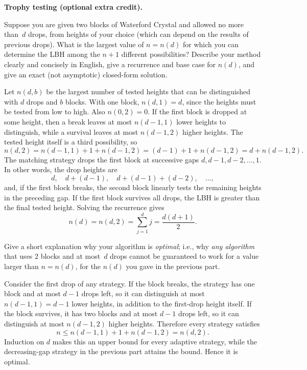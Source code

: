 \documentclass[11pt,addpoints,answers]{exam}
\begin{document}
\begin{questions}
  \bonusquestion \textbf{Trophy testing (optional extra credit).}

  \begin{parts}
    \bonuspart[2] Suppose you are given two blocks of Waterford Crystal and allowed no more than~$d$ drops, from heights of your choice (which can depend on the results of previous drops). What is the largest value of $n=n(d)$ for which you can determine the LBH among the $n+1$ different possibilities? Describe your method clearly and concisely in English, give a recurrence and base case for $n(d)$, and give an exact (not asymptotic) closed-form solution.

    \begin{solution}
      Let $n(d,b)$ be the largest number of tested heights that can be
      distinguished with $d$ drops and $b$ blocks.  With one block,
      $n(d,1)=d$, since the heights must be tested from low to high.  Also
      $n(0,2)=0$.  If the first block is dropped at some height, then a break
      leaves at most $n(d-1,1)$ lower heights to distinguish, while a survival
      leaves at most $n(d-1,2)$ higher heights.  The tested height itself is a
      third possibility, so
      \[
        n(d,2)=n(d-1,1)+1+n(d-1,2)
        =(d-1)+1+n(d-1,2)=d+n(d-1,2).
      \]
      The matching strategy drops the first block at successive gaps
      $d,d-1,d-2,\ldots,1$.  In other words, the drop heights are
      \[
        d,\quad d+(d-1),\quad d+(d-1)+(d-2),\quad\ldots,
      \]
      and, if the first block breaks, the second block linearly tests the
      remaining heights in the preceding gap.  If the first block survives all
      drops, the LBH is greater than the final tested height.  Solving the
      recurrence gives
      \[
        \boxed{n(d)=n(d,2)=\sum_{j=1}^{d}j=\frac{d(d+1)}2.}
      \]
    \end{solution}

    \bonuspart[1] Give a short explanation why your algorithm is \emph{optimal}; i.e., why \emph{any algorithm} that uses 2 blocks and at most~$d$ drops cannot be guaranteed to work for a value larger than $n=n(d)$, for the $n(d)$ you gave in the previous part.

    \begin{solution}
      Consider the first drop of any strategy.  If the block breaks, the
      strategy has one block and at most $d-1$ drops left, so it can distinguish
      at most $n(d-1,1)=d-1$ lower heights, in addition to the first-drop
      height itself.  If the block survives, it has two blocks and at most
      $d-1$ drops left, so it can distinguish at most $n(d-1,2)$ higher
      heights.  Therefore every strategy satisfies
      \[
        n\leq n(d-1,1)+1+n(d-1,2)=n(d,2).
      \]
      Induction on $d$ makes this an upper bound for every adaptive strategy,
      while the decreasing-gap strategy in the previous part attains the
      bound.  Hence it is optimal.
    \end{solution}
  \end{parts}

\end{questions}
\end{document}

